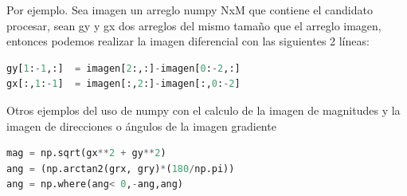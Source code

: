 \documentclass{article}
\begin{document}
Por ejemplo. Sea imagen un arreglo numpy NxM que contiene el candidato procesar, sean gy y gx dos arreglos del mismo tamaño que el arreglo imagen, entonces podemos realizar la imagen diferencial con las siguientes 2 líneas:

\begin{lstlisting}[language=python, caption=Calculo de la imagen diferencial]
gy[1:-1,:]  = imagen[2:,:]-imagen[0:-2,:]
gx[:,1:-1]  = imagen[:,2:]-imagen[:,0:-2]
\end{lstlisting}

Otros ejemplos del uso de numpy con el calculo de la imagen de magnitudes y la imagen de direcciones o ángulos de la imagen gradiente

\begin{lstlisting}[language=python, caption=Calculo de la imagen diferencial]
mag = np.sqrt(gx**2 + gy**2)
ang = (np.arctan2(grx, gry)*(180/np.pi))
ang = np.where(ang< 0,-ang,ang)
\end{lstlisting}
\end{document}
